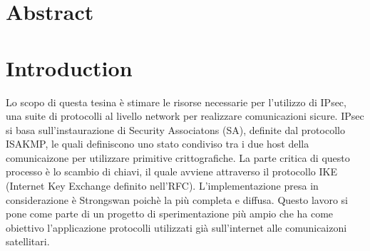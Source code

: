 \documentclass[
10pt, %
a4paper, %
oneside, %
headinclude,footinclude, %
BCOR5mm, %
]{scrartcl}
\title{\normalfont\spacedallcaps{IKEv2 Testing}}
\author{\spacedlowsmallcaps{Davide De Zuane \& Rahmi El Mechri}}
\date{}
\begin{document}
\renewcommand{\sectionmark}[1]{\markright{\spacedlowsmallcaps{#1}}}
\lehead{\mbox{\llap{\small\thepage\kern1em\color{halfgray} \vline}\color{halfgray}\hspace{0.5em}\rightmark\hfil}} 
\pagestyle{scrheadings} 

\maketitle
\newpage
\setcounter{tocdepth}{2} 
\tableofcontents 

\section*{Abstract} 


\newpage
\section{Introduction}
Lo scopo di questa tesina è stimare le risorse necessarie per l'utilizzo di IPsec, una suite di protocolli al livello network per realizzare comunicazioni sicure.
IPsec si basa sull'instaurazione di Security Associatons (SA), definite dal protocollo ISAKMP, le quali definiscono uno stato condiviso tra i due host della comunicaizone per utilizzare
primitive crittografiche. La parte critica di questo processo è lo scambio di chiavi, il quale avviene attraverso il protocollo IKE (Internet Key Exchange definito nell'RFC\cite{rfc7296}).
L'implementazione presa in considerazione è Strongswan poichè la più completa e diffusa. 
Questo lavoro si pone come parte di un progetto di sperimentazione più ampio che ha come obiettivo l'applicazione protocolli utilizzati già sull'internet alle comunicaizoni satellitari.
\\
\end{document}

